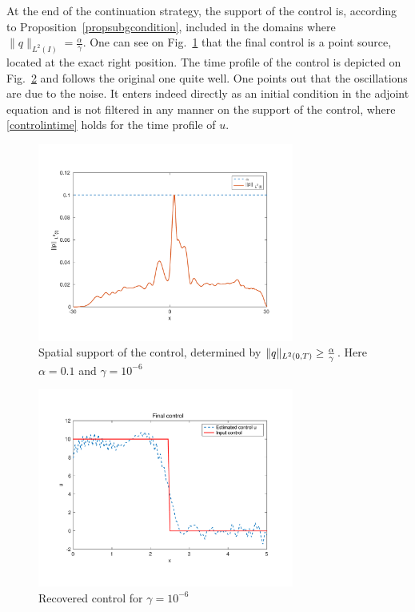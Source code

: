 At the end of the continuation strategy, the support of the control is, according to Proposition~\ref{propsubgcondition}, included in the domains where $\|q\|_{L^2(I)} = \frac{\alpha}{\gamma}$. One can see on Fig.~\ref{support} that the final control is a point source, located at the exact right position. The time profile of the control is depicted on Fig.~\ref{recoveredcontrol} and follows the original one quite well. One points out that the oscillations are due to the noise. It enters indeed directly as an initial condition in the adjoint equation and is not filtered in any manner on the support of the control, where \eqref{controlintime} holds for the time profile of $u$.
\begin{figure}[!h]
\includegraphics[width = 0.75\textwidth]{images/normp.pdf}
\caption{Spatial support of the control, determined by $\lVert q\rVert_{L^2(0,T)}\geq \frac{\alpha}{\gamma}$. Here $\alpha = 0.1$ and $\gamma = 10^{-6}$}
\label{support}
\end{figure}
\begin{figure}[!h]
 \includegraphics[width = 0.75\textwidth]{images/ex1recoveredcontrol2.pdf}
 \caption{Recovered control for $\gamma = 10^{-6}$}
 \label{recoveredcontrol}
\end{figure}
